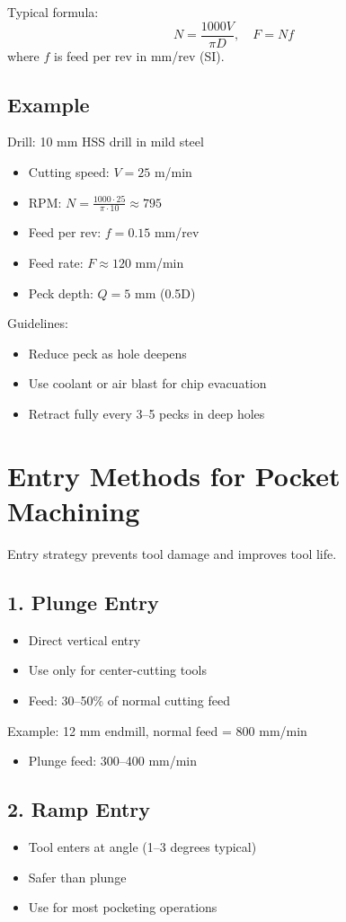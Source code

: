 \documentclass{article}
\begin{document}
Typical formula:
\[
N = \frac{1000 V}{\pi D}, \quad F = N f
\]
where $f$ is feed per rev in mm/rev (SI).

\subsection*{Example}
Drill: 10 mm HSS drill in mild steel
\begin{itemize}
\item Cutting speed: $V = 25$ m/min
\item RPM: $N = \frac{1000\cdot 25}{\pi\cdot 10} \approx 795$
\item Feed per rev: $f = 0.15$ mm/rev
\item Feed rate: $F \approx 120$ mm/min
\item Peck depth: $Q = 5$ mm (0.5D)
\end{itemize}

Guidelines:
\begin{itemize}
\item Reduce peck as hole deepens
\item Use coolant or air blast for chip evacuation
\item Retract fully every 3--5 pecks in deep holes
\end{itemize}

\section*{Entry Methods for Pocket Machining}

Entry strategy prevents tool damage and improves tool life.

\subsection*{1. Plunge Entry}
\begin{itemize}
\item Direct vertical entry
\item Use only for center-cutting tools
\item Feed: 30--50\% of normal cutting feed
\end{itemize}

Example:
12 mm endmill, normal feed = 800 mm/min
\begin{itemize}
\item Plunge feed: 300--400 mm/min
\end{itemize}

\subsection*{2. Ramp Entry}
\begin{itemize}
\item Tool enters at angle (1--3 degrees typical)
\item Safer than plunge
\item Use for most pocketing operations
\end{itemize}
\end{document}
